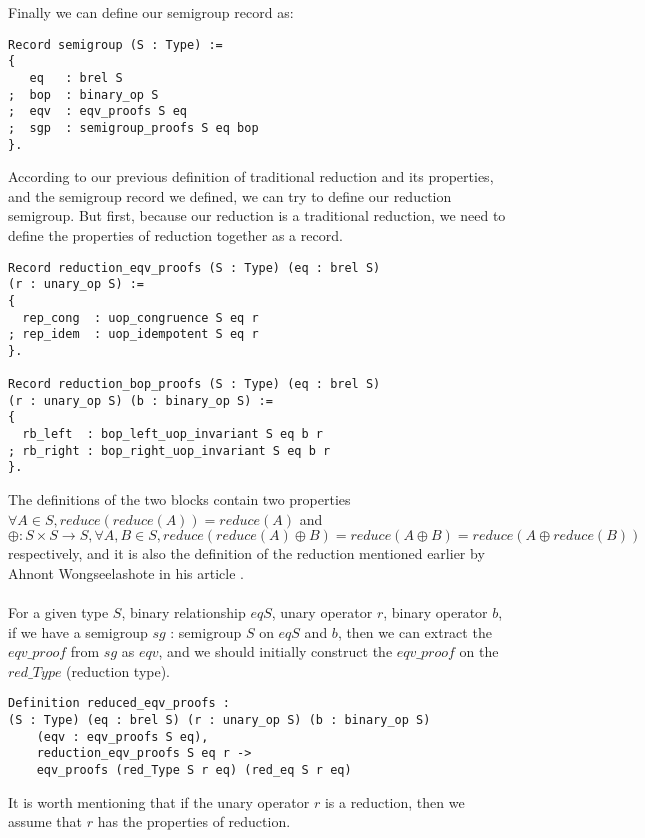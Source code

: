 \documentclass[a4paper,12pt,twoside,openright]{report}
\begin{document}
Finally we can define our semigroup record as:
\begin{lstlisting}[]
Record semigroup (S : Type) :=
{
   eq   : brel S      
;  bop  : binary_op S
;  eqv  : eqv_proofs S eq               
;  sgp  : semigroup_proofs S eq bop
}.

\end{lstlisting}
According to our previous definition of traditional reduction and its properties, and the semigroup record we defined, we can try to define our reduction semigroup.
But first, because our reduction is a traditional reduction, we need to define the properties of reduction together as a record.
\begin{lstlisting}[]
Record reduction_eqv_proofs (S : Type) (eq : brel S) 
(r : unary_op S) :=
{
  rep_cong  : uop_congruence S eq r 
; rep_idem  : uop_idempotent S eq r 
}.

Record reduction_bop_proofs (S : Type) (eq : brel S) 
(r : unary_op S) (b : binary_op S) :=
{
  rb_left  : bop_left_uop_invariant S eq b r
; rb_right : bop_right_uop_invariant S eq b r
}.
\end{lstlisting}
The definitions of the two blocks contain two properties $\forall A \in S, reduce(reduce(A)) = reduce(A)$ and $\oplus : S \times S \rightarrow S, \forall A,B \in S, reduce(reduce(A)\oplus B) = reduce(A\oplus B) = reduce(A\oplus reduce(B))$ respectively, and it is also the definition of the reduction mentioned earlier by Ahnont Wongseelashote in his article \cite{WONGSEELASHOTE197955}.\\\\

For a given type $S$, binary relationship $eqS$, unary operator $r$, binary operator $b$, if we have a semigroup $sg$ : semigroup $S$ on $eqS$ and $b$, then we can extract the $eqv\_proof$ from $sg$ as $eqv$, and we should initially construct the $eqv\_proof$ on the $red\_Type$ (reduction type). 
\begin{lstlisting}
Definition reduced_eqv_proofs : 
(S : Type) (eq : brel S) (r : unary_op S) (b : binary_op S)
	(eqv : eqv_proofs S eq),  
	reduction_eqv_proofs S eq r -> 
	eqv_proofs (red_Type S r eq) (red_eq S r eq)
\end{lstlisting}
It is worth mentioning that if the unary operator $r$ is a reduction, then we assume that $r$ has the properties of reduction.\\
\end{document}
